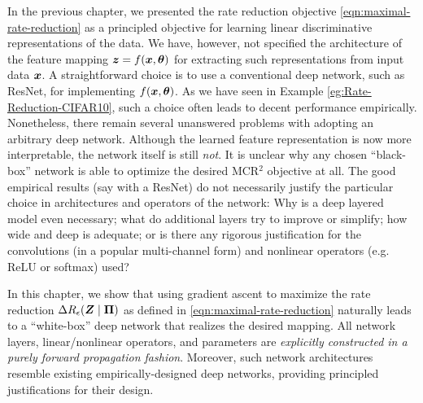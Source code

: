 \documentclass[../../book-main.tex]{subfiles}
\begin{document}
In the previous chapter, we presented the rate reduction objective \eqref{eqn:maximal-rate-reduction} as a principled objective for learning linear discriminative representations of the data. We have, however, not specified the architecture of the feature mapping $\bm{z} = f(\bm{x}, \bm \theta)$ for extracting such representations from input data $\bm{x}$. 
A straightforward choice is to use a conventional deep network, such as ResNet, for implementing $f(\bm{x}, \bm \theta)$. As we have seen in Example \ref{eg:Rate-Reduction-CIFAR10}, such a choice often leads to decent performance empirically. Nonetheless, there remain several unanswered problems with adopting an arbitrary deep network. Although the learned feature representation is now more interpretable, the network itself is still {\em not}. It is unclear why any chosen ``black-box'' network is able to optimize the desired MCR$^2$ objective at all. The good empirical results (say with a ResNet) do not necessarily justify the particular choice in architectures and operators of the network: Why is a deep layered model even necessary; what do additional layers try to improve or simplify; how wide and deep is adequate; or is there any rigorous justification for the convolutions (in a popular multi-channel form) and nonlinear operators (e.g. ReLU or softmax) used? 

In this chapter, we show that using gradient ascent to maximize the rate reduction $\Delta R_{\epsilon}(\bm{Z} \mid \bm \Pi)$ as defined in \eqref{eqn:maximal-rate-reduction} naturally leads to a ``white-box'' deep network that realizes the desired mapping. All network layers, linear/nonlinear operators, and parameters are {\em explicitly constructed in a purely forward propagation fashion}. Moreover, such network architectures resemble existing empirically-designed deep networks, providing principled justifications for their design.
\end{document}
